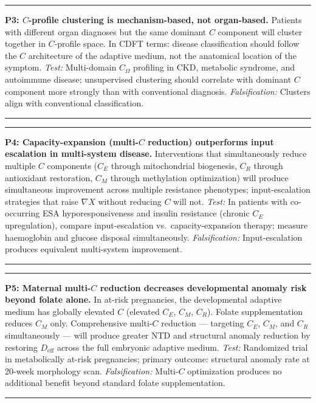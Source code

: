 \documentclass[11pt]{article}
\newcommand{\Om}{\Omega}
\newenvironment{predbox}{\begin{center}\begin{minipage}{0.95\linewidth}\hrule\vspace{0.5em}}{\vspace{0.5em}\hrule\end{minipage}\end{center}}
\begin{document}
\begin{predbox}
\textbf{P3: $C$-profile clustering is mechanism-based, not organ-based.}
Patients with different organ diagnoses but the same dominant $C$ component will cluster together in $C$-profile space. In CDFT terms: disease classification should follow the $C$ architecture of the adaptive medium, not the anatomical location of the symptom. \textit{Test:} Multi-domain $C_\Om$ profiling in CKD, metabolic syndrome, and autoimmune disease; unsupervised clustering should correlate with dominant $C$ component more strongly than with conventional diagnosis. \textit{Falsification:} Clusters align with conventional classification.
\end{predbox}

\begin{predbox}
\textbf{P4: Capacity-expansion (multi-$C$ reduction) outperforms input escalation in multi-system disease.}
Interventions that simultaneously reduce multiple $C$ components ($C_E$ through mitochondrial biogenesis, $C_R$ through antioxidant restoration, $C_M$ through methylation optimization) will produce simultaneous improvement across multiple resistance phenotypes; input-escalation strategies that raise $\nabla X$ without reducing $C$ will not. \textit{Test:} In patients with co-occurring ESA hyporesponsiveness and insulin resistance (chronic $C_E$ upregulation), compare input-escalation vs.\ capacity-expansion therapy; measure haemoglobin and glucose disposal simultaneously. \textit{Falsification:} Input-escalation produces equivalent multi-system improvement.
\end{predbox}

\begin{predbox}
\textbf{P5: Maternal multi-$C$ reduction decreases developmental anomaly risk beyond folate alone.}
In at-risk pregnancies, the developmental adaptive medium has globally elevated $C$ (elevated $C_E$, $C_M$, $C_R$). Folate supplementation reduces $C_M$ only. Comprehensive multi-$C$ reduction --- targeting $C_E$, $C_M$, and $C_R$ simultaneously --- will produce greater NTD and structural anomaly reduction by restoring $D_{\mathrm{eff}}$ across the full embryonic adaptive medium. \textit{Test:} Randomized trial in metabolically at-risk pregnancies; primary outcome: structural anomaly rate at 20-week morphology scan. \textit{Falsification:} Multi-$C$ optimization produces no additional benefit beyond standard folate supplementation.
\end{predbox}

\end{document}
